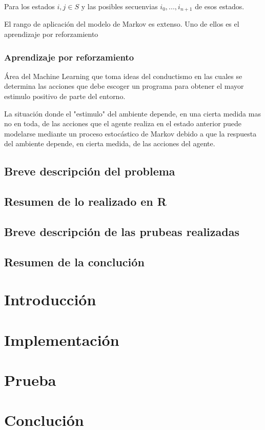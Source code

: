 \documentclass[a4paper]{article}
\begin{document}
Para los estados $i,j \in S$ y las posibles secuenvias $i_{0},..., i_{n+1}$ de esos estados.

El rango de aplicación del modelo de Markov es extenso. Uno de ellos es el aprendizaje por reforzamiento

\subsubsection*{Aprendizaje por reforzamiento}
Área del Machine Learning que toma ideas del conductismo en las cuales se determina las acciones que debe escoger un programa para obtener el mayor estimulo positivo de parte del entorno.

La situación donde el "estimulo" del ambiente depende, en una cierta medida mas no en toda, de las acciones que el agente realiza en el estado anterior puede modelarse mediante un proceso estocástico de Markov debido a que la respuesta del ambiente depende, en cierta medida, de las acciones del agente.


\subsection{Breve descripción del problema}
\subsection{Resumen de lo realizado en R}
\subsection{Breve descripci\'on de las prubeas realizadas}
\subsection{Resumen de la concluci\'on}




\section{Introducci\'on}

\section{Implementaci\'on}

\section{Prueba}

\section{Concluci\'on}
\end{document}
